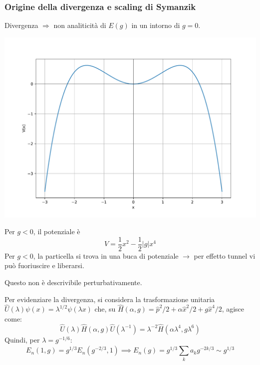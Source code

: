 \documentclass[10pt]{beamer}
\begin{document}
  \begin{frame}
\frametitle{Origine della divergenza e scaling di Symanzik}

Divergenza $\Rightarrow $ non analiticit\`a di $E(g)$ in un intorno di $g=0$. \pause
  \begin{minipage}{0.45\textwidth}
    	\centering
    	\includegraphics[width=\columnwidth]{f1.pdf}
  \end{minipage}%
  \hfill
  \begin{minipage}{0.5\textwidth}
Per $g<0$, il potenziale \`e
\begin{equation*}
	V= \frac{1}{2}x^2 - \frac{1}{2}\lvert g \rvert x^4
\end{equation*}\pause
	  Per $g<0$, la particella si trova in una buca di potenziale $\to$ per effetto tunnel vi pu\`o fuoriuscire e liberarsi.

	  Questo non \`e descrivibile perturbativamente.
  \end{minipage}
\pause
{\hspace{2cm}}
  Per evidenziare la divergenza, si considera la trasformazione unitaria $\hat{U}(\lambda ) \psi (x) = \lambda ^{1 / 2} \psi (\lambda x)$ che, su $\hat{H}(\alpha ,g) = \hat{p}^2 / 2 + \alpha  \hat{x}^2 / 2 + g \hat{x}^4 / 2$, agisce come:\pause
  \begin{equation*}
  	\hat{U}(\lambda ) \hat{H}(\alpha ,g) \hat{U}(\lambda ^{-1} ) = \lambda ^{-2} \hat{H}(\alpha  \lambda ^4, g \lambda ^6)
  \end{equation*}\pause
  Quindi, per $\lambda  = g^{- 1 / 6} $:\pause
  \[
  E_n(1,g) = g^{1 / 3} E_n(g^{-2 / 3} , 1) \implies E_n(g) = g^{1 /3 }  \sum_{k}^{} a_k g^{-2k/3} \sim g^{1 / 3} 
  \] 
  \end{frame} 
\end{document}
